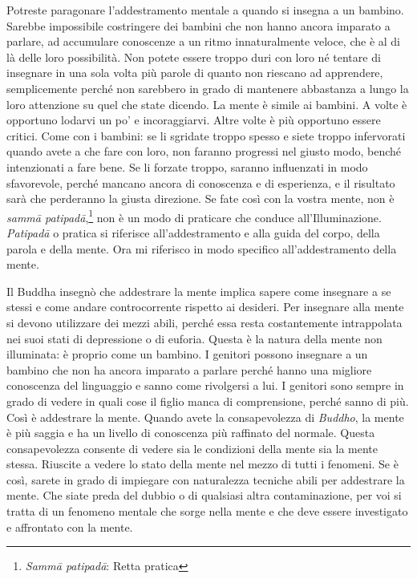 Potreste paragonare l'addestramento mentale a quando si insegna a un
bambino. Sarebbe impossibile costringere dei bambini che non hanno
ancora imparato a parlare, ad accumulare conoscenze a un ritmo
innaturalmente veloce, che è al di là delle loro possibilità. Non potete
essere troppo duri con loro né tentare di insegnare in una sola volta
più parole di quanto non riescano ad apprendere, semplicemente perché
non sarebbero in grado di mantenere abbastanza a lungo la loro
attenzione su quel che state dicendo. La mente è simile ai bambini. A
volte è opportuno lodarvi un po' e incoraggiarvi. Altre volte è più
opportuno essere critici. Come con i bambini: se li sgridate troppo
spesso e siete troppo infervorati quando avete a che fare con loro, non
faranno progressi nel giusto modo, benché intenzionati a fare bene. Se
li forzate troppo, saranno influenzati in modo sfavorevole, perché
mancano ancora di conoscenza e di esperienza, e il risultato sarà che
perderanno la giusta direzione. Se fate così con la vostra mente, non è
\emph{sammā patipadā},\footnote{\emph{Sammā patipadā}: Retta pratica}
non è un modo di praticare che conduce all'Illuminazione.
\emph{Patipadā} o pratica si riferisce all'addestramento e alla guida
del corpo, della parola e della mente. Ora mi riferisco in modo
specifico all'addestramento della mente.

Il Buddha insegnò che addestrare la mente implica sapere come insegnare
a se stessi e come andare controcorrente rispetto ai desideri. Per
insegnare alla mente si devono utilizzare dei mezzi abili, perché essa
resta costantemente intrappolata nei suoi stati di depressione o di
euforia. Questa è la natura della mente non illuminata: è proprio come
un bambino. I genitori possono insegnare a un bambino che non ha ancora
imparato a parlare perché hanno una migliore conoscenza del linguaggio e
sanno come rivolgersi a lui. I genitori sono sempre in grado di vedere
in quali cose il figlio manca di comprensione, perché sanno di più. Così
è addestrare la mente. Quando avete la consapevolezza di \emph{Buddho},
la mente è più saggia e ha un livello di conoscenza più raffinato del
normale. Questa consapevolezza consente di vedere sia le condizioni
della mente sia la mente stessa. Riuscite a vedere lo stato della mente
nel mezzo di tutti i fenomeni. Se è così, sarete in grado di impiegare
con naturalezza tecniche abili per addestrare la mente. Che siate preda
del dubbio o di qualsiasi altra contaminazione, per voi si tratta di un
fenomeno mentale che sorge nella mente e che deve essere investigato e
affrontato con la mente.

